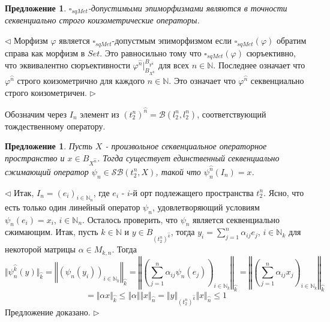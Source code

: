 \documentclass[12pt]{article}
\newtheorem{proposition}[theorem]{Предложение}
\newenvironment{proof}{\par $\triangleleft$}{$\triangleright$}
\begin{document}
\begin{proposition}\label{PrDecsMetrAdmEpiMorph}
$\square_{sqMet}$-допустимыми эпиморфизмами являются в точности секвенциально строго коизометрические операторы.
\end{proposition}
\begin{proof}
Морфизм $\varphi$ является $\square_{sqMet}$-допустмым эпиморфизмом если $\square_{sqMet}(\varphi)$ обратим справа как морфизм в $Set$. Это равносильно тому что $\square_{sqMet}(\varphi)$ сюръективно, 
что эквивалентно  сюръективности $\varphi^{\wideparen{n}}|_{B_{X^{\wideparen{n}}}}^{B_{Y^{\wideparen{n}}}}$ для всех $n\in\mathbb{N}$. Последнее означает что $\varphi^{\wideparen{n}}$ строго коизометрично 
для каждого $n\in\mathbb{N}$. Это означает что $\varphi^{\wideparen{n}}$ секвенциально строго коизометричен.
\end{proof}


Обозначим через $I_n$ элемент из $(t_2^n)^{\wideparen{n}} = \mathcal{B}(l_2^n, l_2^n)$, соответствующий тождественному оператору.

\begin{proposition}\label{PrMetrFrLem} Пусть $X$ - произвольное секвенциальное операторное пространство и $x \in B_{X^{\wideparen{n}}}$. Тогда существует единственный секвенциально сжимающий оператор 
$\psi_n \in \mathcal{SB}(t_2^n, X)$, такой что $\psi_n^{\wideparen{n}}(I_n) = x$.
\end{proposition}
\begin{proof}
Итак, $I_n = (e_i)_{i\in\mathbb{N}_n}$, где $e_i$ - $i$-й орт подлежащего пространства $t_2^n$. Ясно, что есть только один линейный оператор $\psi_n$, удовлетворяющий условиям $\psi_n(e_i) = x_i$, $i\in\mathbb{N}_n$. 
Осталось проверить, что $\psi_n$ является секвенциально сжимающим. Итак, пусть $k \in \mathbb{N}$ и $y \in B_{(t_2^n)^{\wideparen{k}}} $, тогда $y_i = \sum\limits_{j = 1}^n \alpha_{ij}e_j$, $i\in\mathbb{N}_k$ 
для некоторой матрицы $\alpha\in M_{k,n}$. Тогда 
$$
\Vert\psi_n^{\wideparen{k}}(y)\Vert_{\wideparen{k}}
=\left\Vert\left(\psi_n(y_i)\right)_{i\in\mathbb{N}_k}\right\Vert_{\wideparen{k}}
=\left\Vert\left(\sum\limits_{j=1}^n\alpha_{ij}\psi_n(e_j)\right)_{i\in\mathbb{N}_k}\right\Vert_{\wideparen{k}}
=\left\Vert\left(\sum\limits_{j=1}^n\alpha_{ij}x_j\right)_{i\in\mathbb{N}_k}\right\Vert_{\wideparen{k}}
$$
$$
=\Vert\alpha x\Vert_{\wideparen{k}}
\leq\Vert\alpha\Vert\Vert x\Vert_{\wideparen{n}}
=\Vert y\Vert_{(t_2^n)^{\wideparen{k}}}\Vert x\Vert_{\wideparen{n}}\leq 1
$$
Предложение доказано.
\end{proof}
\end{document}
